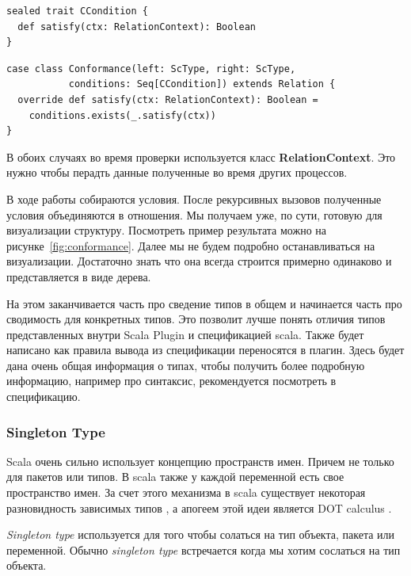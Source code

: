 \begin{lstlisting}[caption={Узел условия},label={lst:condition}]
sealed trait CCondition {
  def satisfy(ctx: RelationContext): Boolean
}
\end{lstlisting}

\begin{lstlisting}[caption={Узел отношения},label={lst:conformance}]
case class Conformance(left: ScType, right: ScType,
           conditions: Seq[CCondition]) extends Relation {
  override def satisfy(ctx: RelationContext): Boolean =
    conditions.exists(_.satisfy(ctx))
}
\end{lstlisting}

В обоих случаях во время проверки используется класс \textbf{RelationContext}.
Это нужно чтобы перадть данные полученные во время других процессов.

В ходе работы собираются условия.
После рекурсивных вызовов полученные условия объединяются в отношения.
Мы получаем уже, по сути, готовую для визуализации структуру.
Посмотреть пример результата можно на рисунке~\ref{fig:conformance}.
Далее мы не будем подробно останавливаться на визуализации.
Достаточно знать что она всегда строится примерно одинаково и представляется в
виде дерева.


На этом заканчивается часть про сведение типов в общем и начинается часть про
сводимость для конкретных типов.
Это позволит лучше понять отличия типов представленных внутри Scala Plugin
и спецификацией scala.
Также будет написано как правила вывода из спецификации переносятся в плагин.
Здесь будет дана очень общая информация о типах, чтобы получить более подробную
информацию, например про синтаксис, рекомендуется посмотреть в спецификацию.

%

\subsubsection{Singleton Type}
Scala очень сильно использует концепцию пространств имен.
Причем не только для пакетов или типов.
В scala также у каждой переменной есть свое пространство имен.
За счет этого механизма в scala существует некоторая разновидность зависимых
типов \cite{dependent_types}, а апогеем этой идеи является DOT calculus
\cite{dot_calculus}.

\textit{Singleton type} используется для того чтобы солаться на тип объекта,
пакета или переменной.
Обычно \textit{singleton type} встречается когда мы хотим сослаться на тип объекта.

